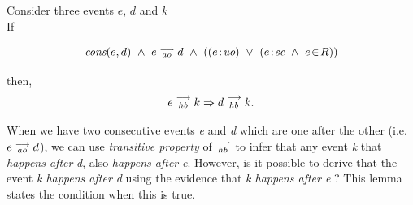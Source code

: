 
\begin{lemma}
    \label{Lemma2}
    Consider three events $e$, $d$ and $k$ \\

    If
        
        \[
            \cons{e}{d} \ \wedge \ \reln{e}{ao}{d} \ \wedge \
            (
                (\et{e}{uo}) \ \vee \
                (\et{e}{sc} \ \wedge \ \event{e}{R})
            )
        \]
        
    then,
        \[
            e\stackrel{\longrightarrow}{_{hb}}k \Rightarrow d\stackrel{\longrightarrow}{_{hb}}k.
        \]

 When we have two consecutive events \textit{e} and \textit{d} which are one after the other (i.e. $e\stackrel{\longrightarrow}{_{ao}}d$), we can use \textit{transitive property} of $\stackrel{\longrightarrow}{_{hb}}$ to infer that any event \textit{k} that \textit{happens after} \textit{d}, also \textit{happens after} \textit{e}. However, is it possible to derive that the event \textit{k happens after d} using the evidence that \textit{k happens after e} ? This lemma states the condition when this is true.

\end{lemma}

